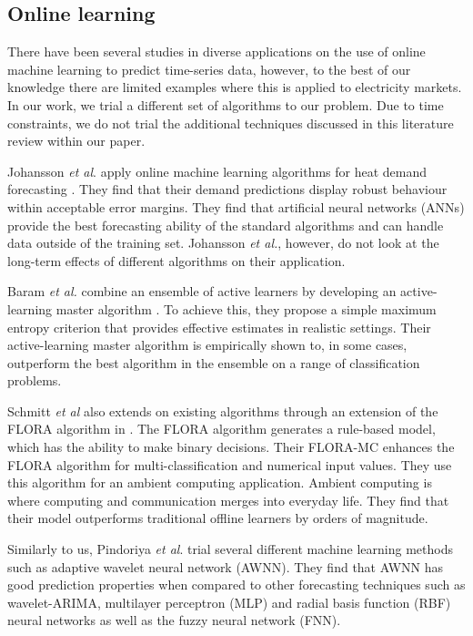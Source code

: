 \documentclass[final,3p,times,twocolumn,numbers]{elsarticle}
\begin{document}
\subsection{Online learning}

There have been several studies in diverse applications on the use of online machine learning to predict time-series data, however, to the best of our knowledge there are limited examples where this is applied to electricity markets. In our work, we trial a different set of algorithms to our problem. Due to time constraints, we do not trial the additional techniques discussed in this literature review within our paper. 

Johansson \textit{et al}. apply online machine learning algorithms for heat demand forecasting \cite{Johansson2017}. They find that their demand predictions display robust behaviour within acceptable error margins. They find that artificial neural networks (ANNs) provide the best forecasting ability of the standard algorithms and can handle data outside of the training set. Johansson \textit{et al.}, however, do not look at the long-term effects of different algorithms on their application.

Baram \textit{et al.} combine an ensemble of active learners by developing an active-learning master algorithm \cite{Baram2003}. To achieve this, they propose a simple maximum entropy criterion that provides effective estimates in realistic settings. Their active-learning master algorithm is empirically shown to, in some cases, outperform the best algorithm in the ensemble on a range of classification problems.

Schmitt \textit{et al} also extends on existing algorithms through an extension of the FLORA algorithm in \cite{Schmitt2008, Widmer1996}. The FLORA algorithm generates a rule-based model, which has the ability to make binary decisions. Their FLORA-MC enhances the FLORA algorithm for multi-classification and numerical input values. They use this algorithm for an ambient computing application. Ambient computing is where computing and communication merges into everyday life. They find that their model outperforms traditional offline learners by orders of magnitude.

Similarly to us, Pindoriya \textit{et al}. trial several different machine learning methods such as adaptive wavelet neural network (AWNN). They find that AWNN has good prediction properties when compared to other forecasting techniques such as wavelet-ARIMA, multilayer perceptron (MLP) and radial basis function (RBF) neural networks as well as the fuzzy neural network (FNN).
\end{document}
